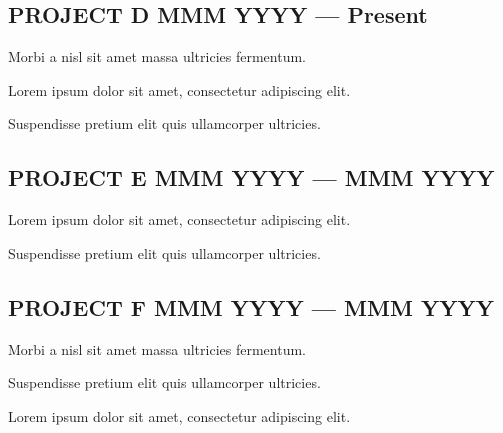 \subsection{{PROJECT D \hfill MMM YYYY --- Present}}
\begin{zitemize}
\item Morbi a nisl sit amet massa ultricies fermentum.
\item Lorem ipsum dolor sit amet, consectetur adipiscing elit.
\item Suspendisse pretium elit quis ullamcorper ultricies.
\end{zitemize}

\subsection{{PROJECT E \hfill MMM YYYY --- MMM YYYY}}
\begin{zitemize}
\item Lorem ipsum dolor sit amet, consectetur adipiscing elit.
\item Suspendisse pretium elit quis ullamcorper ultricies.
\end{zitemize}

\subsection{{PROJECT F \hfill MMM YYYY --- MMM YYYY}}
\begin{zitemize}
\item Morbi a nisl sit amet massa ultricies fermentum.
\item Suspendisse pretium elit quis ullamcorper ultricies.
\item Lorem ipsum dolor sit amet, consectetur adipiscing elit.
\end{zitemize}
